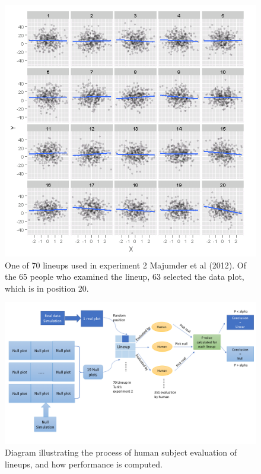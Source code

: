\documentclass[12pt]{article}
\begin{document}
\begin{figure}[h]
\centerline{\includegraphics[width=15cm]{figures/plot_turk2_300_350_12_3.png}}
\caption{One of 70 lineups used in experiment 2 Majumder et al (2012). Of the 65 people who examined the lineup,  63 selected the data plot, which is in position 20.}
\label{expt2}
\end{figure}

\begin{figure}[h]
\centerline{\includegraphics[width=15cm]{figures/diaghm.png}}
\caption{Diagram illustrating the process of human subject evaluation of lineups, and how performance is computed.}
\label{dghm}
\end{figure}
\end{document}
